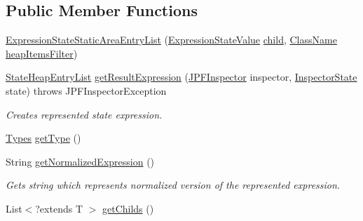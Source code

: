 \subsection*{Public Member Functions}
\begin{DoxyCompactItemize}
\item 
\hyperlink{classgov_1_1nasa_1_1jpf_1_1inspector_1_1server_1_1expression_1_1expressions_1_1_expression_state_static_area_entry_list_ae426aa001e29902c38fcd1028bbdaeb5}{Expression\+State\+Static\+Area\+Entry\+List} (\hyperlink{classgov_1_1nasa_1_1jpf_1_1inspector_1_1server_1_1expression_1_1expressions_1_1_expression_state_value}{Expression\+State\+Value} \hyperlink{classgov_1_1nasa_1_1jpf_1_1inspector_1_1server_1_1expression_1_1_expression_state_unary_operator_a66041b1f569a361549e28a00f7ca5f2f}{child}, \hyperlink{classgov_1_1nasa_1_1jpf_1_1inspector_1_1utils_1_1expressions_1_1_class_name}{Class\+Name} \hyperlink{classgov_1_1nasa_1_1jpf_1_1inspector_1_1server_1_1expression_1_1expressions_1_1_expression_state_static_area_entry_list_a9c9eb1befb339add68a81b78db3a8703}{heap\+Items\+Filter})
\item 
\hyperlink{classgov_1_1nasa_1_1jpf_1_1inspector_1_1server_1_1programstate_1_1_state_heap_entry_list}{State\+Heap\+Entry\+List} \hyperlink{classgov_1_1nasa_1_1jpf_1_1inspector_1_1server_1_1expression_1_1expressions_1_1_expression_state_static_area_entry_list_aca697e7e833e829577a2faba14950328}{get\+Result\+Expression} (\hyperlink{classgov_1_1nasa_1_1jpf_1_1inspector_1_1server_1_1jpf_1_1_j_p_f_inspector}{J\+P\+F\+Inspector} inspector, \hyperlink{interfacegov_1_1nasa_1_1jpf_1_1inspector_1_1server_1_1expression_1_1_inspector_state}{Inspector\+State} state)  throws J\+P\+F\+Inspector\+Exception 
\begin{DoxyCompactList}\small\item\em Creates represented state expression. \end{DoxyCompactList}\item 
\hyperlink{enumgov_1_1nasa_1_1jpf_1_1inspector_1_1server_1_1expression_1_1_types}{Types} \hyperlink{classgov_1_1nasa_1_1jpf_1_1inspector_1_1server_1_1expression_1_1expressions_1_1_expression_state_static_area_entry_list_a1fa57735924eab3934b783e09cbc009e}{get\+Type} ()
\item 
String \hyperlink{classgov_1_1nasa_1_1jpf_1_1inspector_1_1server_1_1expression_1_1expressions_1_1_expression_state_static_area_entry_list_adeb7b6c431edf2a46015e3b9a5e6dce6}{get\+Normalized\+Expression} ()
\begin{DoxyCompactList}\small\item\em Gets string which represents normalized version of the represented expression. \end{DoxyCompactList}\item 
List$<$?extends T $>$ \hyperlink{classgov_1_1nasa_1_1jpf_1_1inspector_1_1server_1_1expression_1_1_expression_state_unary_operator_ad010bcb9c4e2eb584321b5ceba8e1682}{get\+Childs} ()
\end{DoxyCompactItemize}
